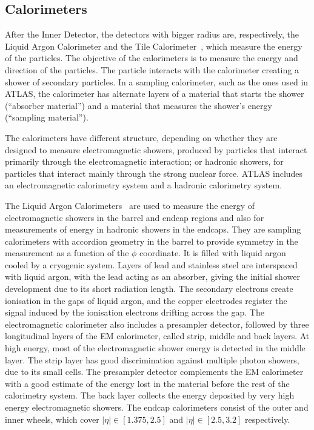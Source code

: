 \subsection{Calorimeters}

After the Inner Detector, the detectors with bigger radius are, respectively,
the Liquid Argon Calorimeter and the Tile Calorimeter~\cite{detpaper}, which measure
the energy of the particles.
The objective of the calorimeters is to measure the energy and direction of the particles.
The particle interacts with the calorimeter creating a shower of secondary particles.
In a sampling calorimeter, such as the ones used in ATLAS, the calorimeter has alternate layers of a material that
starts the shower (``absorber material'') and a material that measures the shower's energy (``sampling material'').

The calorimeters have different structure, depending on whether they are designed to measure
electromagnetic showers, produced by particles that interact primarily through the electromagnetic interaction; or hadronic
showers, for particles that interact mainly through the strong nuclear force. ATLAS includes an electromagnetic calorimetry system and a hadronic
calorimetry system.

The Liquid Argon Calorimeters~\cite{lartdr1} are used to measure the energy of
electromagnetic showers in the barrel and endcap regions and also for
measurements of energy in hadronic showers in the endcaps.
They are sampling calorimeters with accordion geometry in the barrel to provide symmetry in the measurement as a function
of the $\phi$ coordinate.
It is filled with liquid
argon cooled by a cryogenic system. Layers of lead and stainless steel
are interspaced with liquid argon, with the lead acting as an absorber, giving the
initial shower development due to its short radiation length.
The secondary electrons create ionisation in the gaps of liquid argon, and
the copper electrodes register the signal induced by the ionisation
electrons drifting across the gap. The electromagnetic calorimeter also includes a presampler
detector, followed by three longitudinal layers of the EM calorimeter, called strip, middle and back layers.
At high energy, most of the electromagnetic shower energy is detected in the middle layer. The strip layer
has good discrimination against multiple photon showers, due to its small
cells. The presampler detector complements the EM calorimeter
with a good estimate of the energy lost in the material before the rest of the calorimetry system. The back layer collects the energy
deposited by very high energy electromagnetic showers.
The endcap calorimeters consist of the outer and inner wheels, which cover $|\eta| \in [1.375, 2.5]$ and $|\eta| \in [2.5, 3.2]$ respectively.

